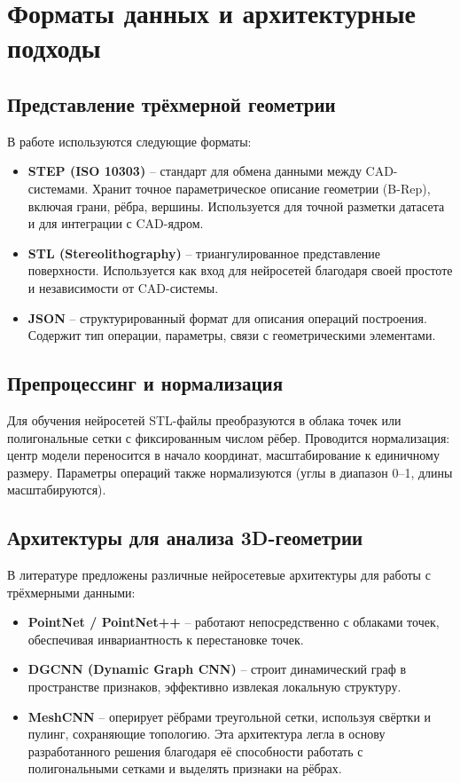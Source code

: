\section{Форматы данных и архитектурные подходы}

\subsection{Представление трёхмерной геометрии}
В работе используются следующие форматы:
\begin{itemize}
    \item \textbf{STEP (ISO 10303)} – стандарт для обмена данными между CAD-системами. Хранит точное параметрическое описание геометрии (B-Rep), включая грани, рёбра, вершины. Используется для точной разметки датасета и для интеграции с CAD-ядром.
    \item \textbf{STL (Stereolithography)} – триангулированное представление поверхности. Используется как вход для нейросетей благодаря своей простоте и независимости от CAD-системы.
    \item \textbf{JSON} – структурированный формат для описания операций построения. Содержит тип операции, параметры, связи с геометрическими элементами.
\end{itemize}

\subsection{Препроцессинг и нормализация}
Для обучения нейросетей STL-файлы преобразуются в облака точек или полигональные сетки с фиксированным числом рёбер. Проводится нормализация: центр модели переносится в начало координат, масштабирование к единичному размеру. Параметры операций также нормализуются (углы в диапазон 0–1, длины масштабируются).

\subsection{Архитектуры для анализа 3D-геометрии}
В литературе предложены различные нейросетевые архитектуры для работы с трёхмерными данными:
\begin{itemize}
    \item \textbf{PointNet / PointNet++} – работают непосредственно с облаками точек, обеспечивая инвариантность к перестановке точек.
    \item \textbf{DGCNN (Dynamic Graph CNN)} – строит динамический граф в пространстве признаков, эффективно извлекая локальную структуру.
    \item \textbf{MeshCNN} – оперирует рёбрами треугольной сетки, используя свёртки и пулинг, сохраняющие топологию. Эта архитектура легла в основу разработанного решения благодаря её способности работать с полигональными сетками и выделять признаки на рёбрах.
\end{itemize}

